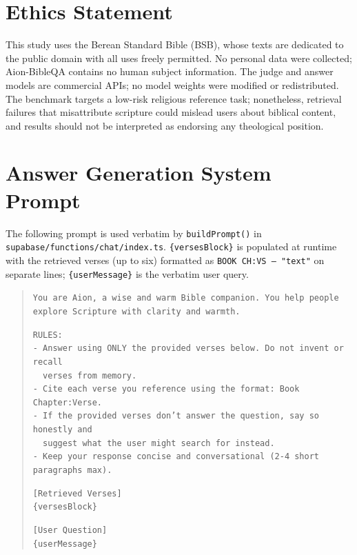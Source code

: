 \documentclass[11pt]{article}
\begin{document}
\section*{Ethics Statement}

This study uses the Berean Standard Bible (BSB), whose texts are dedicated to the public domain with all uses freely permitted.
No personal data were collected; Aion-BibleQA contains no human subject information.
The judge and answer models are commercial APIs; no model weights were modified or redistributed.
The benchmark targets a low-risk religious reference task; nonetheless, retrieval failures that misattribute scripture could mislead users about biblical content, and results should not be interpreted as endorsing any theological position.



\appendix

\section{Answer Generation System Prompt}
\label{app:prompt}

The following prompt is used verbatim by \texttt{buildPrompt()} in
\texttt{supabase/functions/chat/index.ts}.
\texttt{\{versesBlock\}} is populated at runtime with the retrieved
verses (up to six) formatted as \texttt{BOOK CH:VS --- "text"} on separate lines;
\texttt{\{userMessage\}} is the verbatim user query.

\begin{quote}
\small
\texttt{You are Aion, a wise and warm Bible companion. You help people explore
Scripture with clarity and warmth.}

\texttt{RULES:}\\
\texttt{- Answer using ONLY the provided verses below. Do not invent or recall}\\
\texttt{\ \ verses from memory.}\\
\texttt{- Cite each verse you reference using the format: Book Chapter:Verse.}\\
\texttt{- If the provided verses don't answer the question, say so honestly and}\\
\texttt{\ \ suggest what the user might search for instead.}\\
\texttt{- Keep your response concise and conversational (2-4 short paragraphs max).}

\texttt{[Retrieved Verses]}\\
\texttt{\{versesBlock\}}

\texttt{[User Question]}\\
\texttt{\{userMessage\}}
\end{quote}
\end{document}
